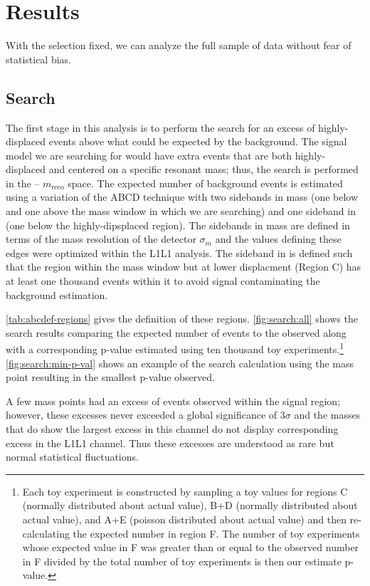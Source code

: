 \section{Results}
With the selection fixed, we can analyze the full sample of data without fear of
statistical bias.

\subsection{Search}
The first stage in this analysis is to perform the search for an excess of highly-displaced
events above what could be expected by the background.
The signal model we are searching for would have extra events that are both highly-displaced
and centered on a specific resonant mass; thus, the search is performed in the \minyzero -- $m_\mathrm{reco}$
space.
The expected number of background events is estimated using a variation of the ABCD technique
with two sidebands in mass (one below and one above the mass window in which we are searching)
and one sideband in \minyzero (one below the highly-dipsplaced region).
The sidebands in mass are defined in terms of the mass resolution of the detector $\sigma_m$
and the values defining these edges were optimized within the L1L1 analysis.
The sideband in \minyzero is defined such that the region within the mass window but
at lower displacment (Region C) has at least one thousand events within it to avoid signal contaminating
the background estimation.

\cref{tab:abcdef-regions} gives the definition of these regions.
\cref{fig:search:all} shows the search results comparing the expected number of events to the
observed along with a corresponding p-value estimated using ten thousand toy experiments.\footnote{
  Each toy experiment is constructed by sampling a toy values for regions C (normally distributed about actual value),
  B+D (normally distributed about actual value), and A+E (poisson distributed about actual value) and
  then re-calculating the expected number in region F. The number of toy experiments whose expected
  value in F was greater than or equal to the observed number in F divided by the total number of
  toy experiments is then our estimate p-value.
}
\cref{fig:search:min-p-val} shows an example of the search calculation using the mass point resulting
in the smallest p-value observed.

A few mass points had an excess of events observed within the signal region; however,
these excesses never exceeded a global significance of $3\sigma$ and the masses
that do show the largest excess in this channel do not display corresponding excess in the
L1L1 channel.
Thus these excesses are understood as rare but normal statistical fluctuations.


